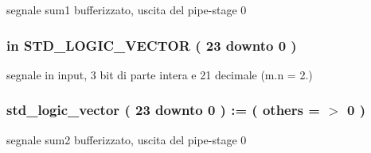 segnale sum1 bufferizzato, uscita del pipe-\/stage 0 

\subsubsection[{\texorpdfstring{Sum2}{Sum2}}]{ {\bfseries \textcolor{vhdlchar}{in}\textcolor{vhdlchar}{ }} {\bfseries \textcolor{vhdlchar}{S\+T\+D\+\_\+\+L\+O\+G\+I\+C\+\_\+\+V\+E\+C\+T\+OR}\textcolor{vhdlchar}{ }\textcolor{vhdlchar}{(}\textcolor{vhdlchar}{ }\textcolor{vhdlchar}{ } \textcolor{vhdldigit}{23} \textcolor{vhdlchar}{ }\textcolor{vhdlchar}{downto}\textcolor{vhdlchar}{ }\textcolor{vhdlchar}{ } \textcolor{vhdldigit}{0} \textcolor{vhdlchar}{ }\textcolor{vhdlchar}{)}\textcolor{vhdlchar}{ }} \hspace{0.3cm}{\ttfamily [Port]}}\hypertarget{group___linear_regression_ga4c98819455589b84c5e250a97e9bdfa1}{}\label{group___linear_regression_ga4c98819455589b84c5e250a97e9bdfa1}


segnale in input, 3 bit di parte intera e 21 decimale (m.\+n = 2.) 

\subsubsection[{\texorpdfstring{sum2\+\_\+buff0}{sum2_buff0}}]{ {\bfseries \textcolor{vhdlchar}{std\+\_\+logic\+\_\+vector}\textcolor{vhdlchar}{ }\textcolor{vhdlchar}{(}\textcolor{vhdlchar}{ }\textcolor{vhdlchar}{ } \textcolor{vhdldigit}{23} \textcolor{vhdlchar}{ }\textcolor{vhdlchar}{downto}\textcolor{vhdlchar}{ }\textcolor{vhdlchar}{ } \textcolor{vhdldigit}{0} \textcolor{vhdlchar}{ }\textcolor{vhdlchar}{)}\textcolor{vhdlchar}{ }\textcolor{vhdlchar}{ }\textcolor{vhdlchar}{ }\textcolor{vhdlchar}{\+:}\textcolor{vhdlchar}{=}\textcolor{vhdlchar}{ }\textcolor{vhdlchar}{(}\textcolor{vhdlchar}{ }\textcolor{vhdlchar}{ }\textcolor{vhdlchar}{others}\textcolor{vhdlchar}{ }\textcolor{vhdlchar}{ }\textcolor{vhdlchar}{=}\textcolor{vhdlchar}{ }\textcolor{vhdlchar}{$>$}\textcolor{vhdlchar}{ }\textcolor{vhdlchar}{\textquotesingle{}}\textcolor{vhdlchar}{ } \textcolor{vhdldigit}{0} \textcolor{vhdlchar}{ }\textcolor{vhdlchar}{\textquotesingle{}}\textcolor{vhdlchar}{ }\textcolor{vhdlchar}{)}\textcolor{vhdlchar}{ }} \hspace{0.3cm}{\ttfamily [Signal]}}\hypertarget{group___linear_regression_ga78bc8ef63466051b7ffb10623742f533}{}\label{group___linear_regression_ga78bc8ef63466051b7ffb10623742f533}


segnale sum2 bufferizzato, uscita del pipe-\/stage 0 

